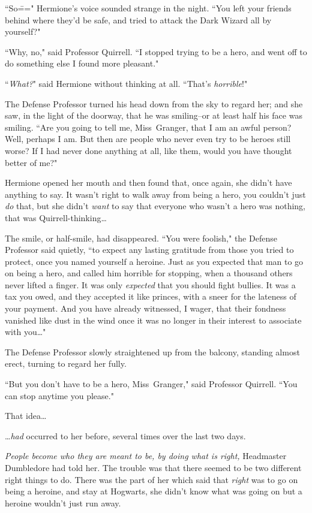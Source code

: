 ``So\===" Hermione's voice sounded strange in the night. ``You left your friends behind where they'd be safe, and tried to attack the Dark Wizard all by yourself?"

``Why, no," said Professor Quirrell. ``I stopped trying to be a hero, and went off to do something else I found more pleasant."

``\emph{What?}" said Hermione without thinking at all. ``That's \emph{horrible}!"

The Defense Professor turned his head down from the sky to regard her; and she saw, in the light of the doorway, that he was smiling\---or at least half his face was smiling. ``Are you going to tell me, Miss~Granger, that I am an awful person? Well, perhaps I am. But then are people who never even try to be heroes still worse? If I had never done anything at all, like them, would you have thought better of me?"

Hermione opened her mouth and then found that, once again, she didn't have anything to say. It wasn't right to walk away from being a hero, you couldn't just \emph{do} that, but she didn't \emph{want} to say that everyone who wasn't a hero was nothing, that was Quirrell-thinking{\ldots}

The smile, or half-smile, had disappeared. ``You were foolish," the Defense Professor said quietly, ``to expect any lasting gratitude from those you tried to protect, once you named yourself a heroine. Just as you expected that man to go on being a hero, and called him horrible for stopping, when a thousand others never lifted a finger. It was only \emph{expected} that you should fight bullies. It was a tax you owed, and they accepted it like princes, with a sneer for the lateness of your payment. And you have already witnessed, I wager, that their fondness vanished like dust in the wind once it was no longer in their interest to associate with you{\ldots}"

The Defense Professor slowly straightened up from the balcony, standing almost erect, turning to regard her fully.

``But you don't have to be a hero, Miss~Granger," said Professor Quirrell. ``You can stop anytime you please."

That idea{\ldots}

{\ldots}\emph{had} occurred to her before, several times over the last two days.

\emph{People become who they are meant to be, by doing what is right,} Headmaster Dumbledore had told her. The trouble was that there seemed to be two different right things to do. There was the part of her which said that \emph{right} was to go on being a heroine, and stay at Hogwarts, she didn't know what was going on but a heroine wouldn't just run away.

